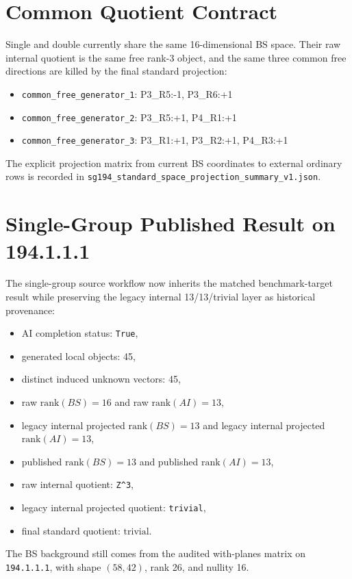 \documentclass[11pt]{article}
\begin{document}
\section{Common Quotient Contract}
Single and double currently share the same 16-dimensional BS space. Their raw internal quotient is the same free rank-3 object, and the same three common free directions are killed by the final standard projection:
\begin{itemize}
\item \texttt{common\_free\_generator\_1}: P3\_R5:-1, P3\_R6:+1
\item \texttt{common\_free\_generator\_2}: P3\_R5:+1, P4\_R1:+1
\item \texttt{common\_free\_generator\_3}: P3\_R1:+1, P3\_R2:+1, P4\_R3:+1
\end{itemize}

The explicit projection matrix from current BS coordinates to external ordinary rows is recorded in \texttt{sg194\_standard\_space\_projection\_summary\_v1.json}.

\section{Single-Group Published Result on 194.1.1.1}
The single-group source workflow now inherits the matched benchmark-target result while preserving the legacy internal 13/13/trivial layer as historical provenance:
\begin{itemize}
\item AI completion status: \texttt{True},
\item generated local objects: 45,
\item distinct induced unknown vectors: 45,
\item raw $\mathrm{rank}(BS) = 16$ and raw $\mathrm{rank}(AI) = 13$,
\item legacy internal projected $\mathrm{rank}(BS) = 13$ and legacy internal projected $\mathrm{rank}(AI) = 13$,
\item published $\mathrm{rank}(BS) = 13$ and published $\mathrm{rank}(AI) = 13$,
\item raw internal quotient: \texttt{Z\textasciicircum{}3},
\item legacy internal projected quotient: \texttt{trivial},
\item final standard quotient: $\mathrm{trivial}$.
\end{itemize}
The BS background still comes from the audited with-planes matrix on \texttt{194.1.1.1}, with shape $(58,42)$, rank 26, and nullity 16.
\end{document}
